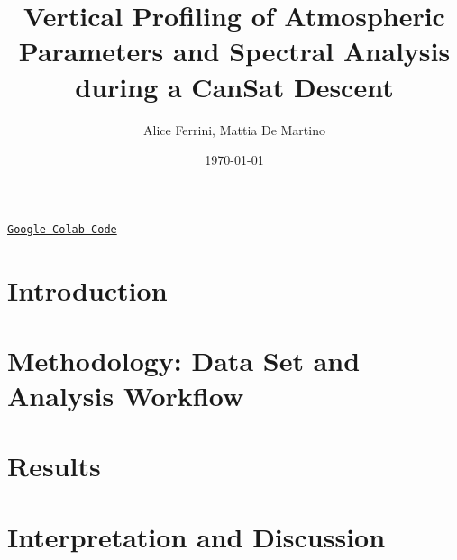 \documentclass[11pt]{article}
\title{{\titlefont \textbf{Vertical Profiling of Atmospheric Parameters and Spectral Analysis during a CanSat Descent
}}}
\author{Alice Ferrini, Mattia De Martino}
\date{\today}
\begin{document}
\maketitle

\begin{center}
    \small\href{https://colab.research.google.com/github/mattiademartino/Space_Data_2/blob/main/main.ipynb}{\texttt{Google Colab Code}}
\end{center}



\setlength{\belowdisplayskip}{3pt} \setlength{\belowdisplayshortskip}{3pt}
\setlength{\abovedisplayskip}{3pt} \setlength{\abovedisplayshortskip}{0pt}

\section{Introduction}
 


\section{Methodology: Data Set and Analysis Workflow}



\section{Results}
 

\section{Interpretation and Discussion}
 

\setlength{\belowdisplayskip}{0pt} \setlength{\belowdisplayshortskip}{0pt}
\setlength{\abovedisplayskip}{0pt} \setlength{\abovedisplayshortskip}{0pt}

\small
{}
\setlength{\bibsep}{0pt plus 0.3ex}

% 
{\footnotesize}
\end{document}
